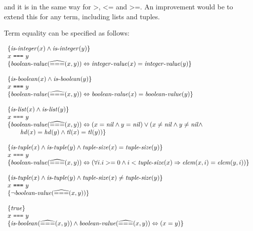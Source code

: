 and it is in the same way for $\texttt{>}$, $\texttt{<=}$ and $\texttt{>=}$. An
improvement would be to extend this for any term, including lists and tuples.

Term equality can be specified as follows:

\[
\begin{array}{l}
\{ \mathit{is\mbox{-}integer}(x) \wedge \mathit{is\mbox{-}integer}(y) \}\\
x~\texttt{===}~y\\
\{ \mathit{boolean\mbox{-}value}(\widehat{===}(x, y)) \Leftrightarrow \mathit{integer\mbox{-}value}(x) = \mathit{integer\mbox{-}value}(y) \}\\
\\
\{ \mathit{is\mbox{-}boolean}(x) \wedge \mathit{is\mbox{-}boolean}(y) \}\\
x~\texttt{===}~y\\
\{ \mathit{boolean\mbox{-}value}(\widehat{===}(x, y)) \Leftrightarrow \mathit{boolean\mbox{-}value}(x) = \mathit{boolean\mbox{-}value}(y) \}\\
\\
\{ \mathit{is\mbox{-}list}(x) \wedge \mathit{is\mbox{-}list}(y) \}\\
x~\texttt{===}~y\\
\{ \mathit{boolean\mbox{-}value}(\widehat{===}(x, y)) \Leftrightarrow 
  (x = \mathit{nil} \wedge y = \mathit{nil})
  \vee (x \neq \mathit{nil} \wedge y \neq \mathit{nil} \wedge\\
  \quad\quad\mathit{hd}(x) = \mathit{hd}(y) \land \mathit{tl}(x) = \mathit{tl}(y)) \}\\
\\
\{ \mathit{is\mbox{-}tuple}(x) \wedge \mathit{is\mbox{-}tuple}(y) \wedge \mathit{tuple\mbox{-}size}(x) = \mathit{tuple\mbox{-}size}(y) \}\\
x~\texttt{===}~y\\
\{ \mathit{boolean\mbox{-}value}(\widehat{===}(x, y)) \Leftrightarrow 
  (\forall i. i >= 0 \wedge i < \mathit{tuple\mbox{-}size}(x) \Rightarrow \mathit{elem}(x, i) = \mathit{elem}(y, i)) \}\\
\\
\{ \mathit{is\mbox{-}tuple}(x) \wedge \mathit{is\mbox{-}tuple}(y) \wedge \mathit{tuple\mbox{-}size}(x) \neq \mathit{tuple\mbox{-}size}(y) \}\\
x~\texttt{===}~y\\
\{ \neg\mathit{boolean\mbox{-}value}(\widehat{===}(x, y)) \}\\
\\
\{\mathit{true}\}\\
x~\texttt{===}~y\\
\{ \mathit{is\mbox{-}boolean}(\widehat{===}(x, y)) \wedge \mathit{boolean\mbox{-}value}(\widehat{===}(x, y)) \Leftrightarrow (x = y) \}\\
\\
\end{array}
\]

